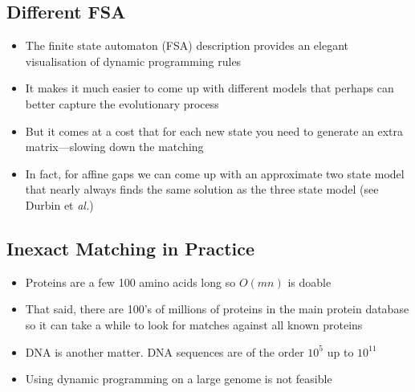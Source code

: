 
\begin{slide}
\section{Different FSA}

\begin{PauseHighLight}
  \begin{itemize}
  \item The finite state automaton (FSA) description provides an elegant
    visualisation of dynamic programming rules\pause
  \item It makes it much easier to come up with different models
    that perhaps can better capture the evolutionary process\pause
  \item But it comes at a cost that for each new state you need to
    generate an extra matrix---slowing down the matching\pause
  \item In fact, for affine gaps we can come up with an approximate two
    state model that nearly always finds the same solution as the three
    state model (see Durbin et \textit{al.})\pause
  \end{itemize}
\end{PauseHighLight}

\end{slide}


\Outline %

\begin{slide}
\section{Inexact Matching in Practice}

\begin{PauseHighLight}
  \begin{itemize}
  \item Proteins are a few 100 amino acids long so $O(mn)$ is
    doable\pause
  \item That said, there are 100's of millions of proteins in the main
    protein database so it can take a while to look for matches against
    all known proteins\pause
  \item DNA is another matter.  DNA sequences are of the order
    $10^5$ up to $10^{11}$\pause
  \item Using dynamic programming on a large genome is not
    feasible\pause
  \end{itemize}
\end{PauseHighLight}

\end{slide}

